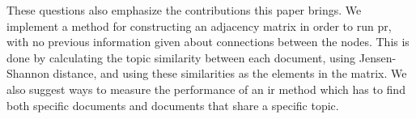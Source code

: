 These questions also emphasize the contributions this paper brings.
We implement a method for constructing an adjacency matrix in order to run \gls{pr}, with no previous information given about connections between the nodes.
This is done by calculating the topic similarity between each document, using Jensen-Shannon distance, and using these similarities as the elements in the matrix.
We also suggest ways to measure the performance of an \gls{ir} method which has to find both specific documents and documents that share a specific topic.
